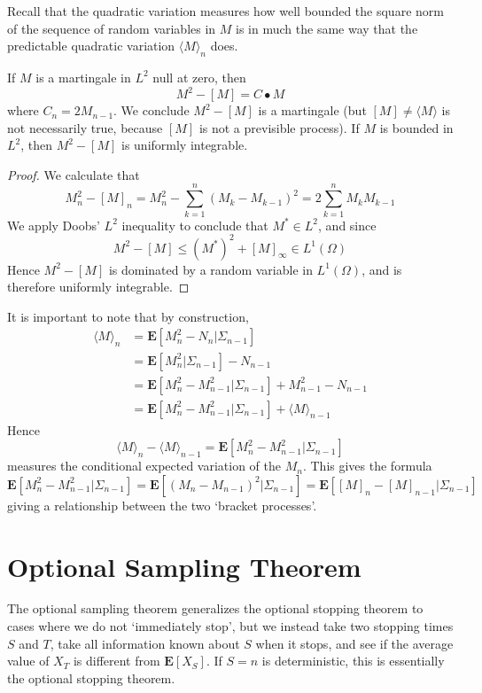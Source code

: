 Recall that the quadratic variation measures how well bounded the square norm of the sequence of random variables in $M$ is in much the same way that the predictable quadratic variation $\langle M \rangle_n$ does.

\begin{theorem}
    If $M$ is a martingale in $L^2$ null at zero, then
    \[ M^2 - [M] = C \bullet M \]
    where $C_n = 2M_{n-1}$. We conclude $M^2 - [M]$ is a martingale (but $[M] \neq \langle M \rangle$ is not necessarily true, because $[M]$ is not a previsible process). If $M$ is bounded in $L^2$, then $M^2 - [M]$ is uniformly integrable.
\end{theorem}
\begin{proof}
    We calculate that
    \[ M^2_n - [M]_n = M_n^2 - \sum_{k = 1}^n (M_k - M_{k-1})^2 = 2 \sum_{k = 1}^n M_k M_{k-1} \]
    We apply Doobs' $L^2$ inequality to conclude that $M^* \in L^2$, and since
    \[ M^2 - [M] \leq (M^*)^2 + [M]_\infty \in L^1(\Omega) \]
    Hence $M^2 - [M]$ is dominated by a random variable in $L^1(\Omega)$, and is therefore uniformly integrable.
\end{proof}

It is important to note that by construction,
    \begin{align*}
        \langle M \rangle_n &= \mathbf{E}[M_n^2 - N_n|\Sigma_{n-1}]\\
        &= \mathbf{E}[M_n^2|\Sigma_{n-1}] - N_{n-1}\\
        &= \mathbf{E}[M_n^2 - M_{n-1}^2|\Sigma_{n-1}] + M_{n-1}^2 - N_{n-1}\\
        &= \mathbf{E}[M_n^2 - M_{n-1}^2|\Sigma_{n-1}] + \langle M \rangle_{n-1}
    \end{align*}
    Hence
    \[ \langle M \rangle_n - \langle M \rangle_{n-1} = \mathbf{E}[M_n^2 - M_{n-1}^2|\Sigma_{n-1}] \]
    measures the conditional expected variation of the $M_n$. This gives the formula
    \[ \mathbf{E}[M_n^2 - M_{n-1}^2|\Sigma_{n-1}] = \mathbf{E}[(M_n - M_{n-1})^2|\Sigma_{n-1}] = \mathbf{E}[[M]_n - [M]_{n-1}|\Sigma_{n-1}] \]
    giving a relationship between the two `bracket processes'.

\section{Optional Sampling Theorem}

The optional sampling theorem generalizes the optional stopping theorem to cases where we do not `immediately stop', but we instead take two stopping times $S$ and $T$, take all information known about $S$ when it stops, and see if the average value of $X_T$ is different from $\mathbf{E}[X_S]$. If $S = n$ is deterministic, this is essentially the optional stopping theorem.

